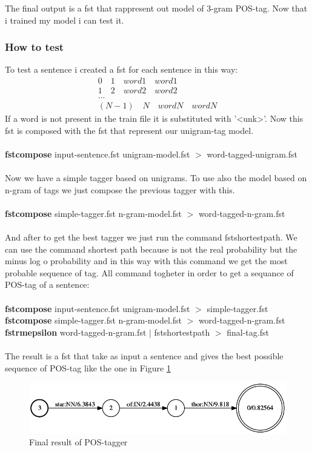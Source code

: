 \documentclass[a4paper,8pt,oneside]{article}
\begin{document}
			The final output is a fst that rappresent out model of 3-gram POS-tag.
			Now that i trained my model i can test it.

		\subsubsection{How to test}
		    To test a sentence i created a fst for each sentence in this way:
			\begin{gather*}
					0 \quad 1 \quad word1 \quad word1 \\
					1 \quad 2 \quad word2 \quad word2 \\
					... \\
					(N-1) \quad N \quad wordN \quad wordN	
			\end{gather*}
			If a word is not present in the train file it is substituted with '<unk>'.
			Now this fst is composed with the fst that represent our unigram-tag model. \\ \\
			\textbf{fstcompose} input-sentence.fst unigram-model.fst $>$ word-tagged-unigram.fst \\ \\
			Now we have a simple tagger based on unigrams. To use also the model based on n-gram of tags we just compose the previous tagger with this. \\ \\
			\textbf{fstcompose} simple-tagger.fst n-gram-model.fst $>$ word-tagged-n-gram.fst \\ \\
			And after to get the best tagger we just run the command fstshortestpath. We can use the command shortest path because is not the real probability but the minus log o probability and in this way with this command we get the most probable sequence of tag. All command togheter in order to get a sequance of POS-tag of a sentence: \\ \\
			\textbf{fstcompose} input-sentence.fst unigram-model.fst $>$ simple-tagger.fst \\
			\textbf{fstcompose} simple-tagger.fst n-gram-model.fst $>$ word-tagged-n-gram.fst \\
			\textbf{fstrmepsilon} word-tagged-n-gram.fst $|$ fstshortestpath $>$ final-tag.fst \\ \\

			The result is a fst that take as input a sentence and gives the best possible sequence of POS-tag like the one in Figure \ref{tagger-final}
			\begin{figure}[h!]
			  \centering
			    \includegraphics[width=1.0\textwidth]{img/tagger}
			  \caption{Final result of POS-tagger}
			  \label{tagger-final}
			\end{figure}
\end{document}
